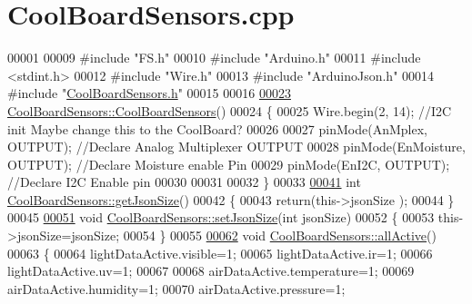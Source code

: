 \hypertarget{_cool_board_sensors_8cpp_source}{}\section{Cool\+Board\+Sensors.\+cpp}

\begin{DoxyCode}
00001 
00009 \textcolor{preprocessor}{#include "FS.h"}
00010 \textcolor{preprocessor}{#include "Arduino.h"}
00011 \textcolor{preprocessor}{#include <stdint.h>}        
00012 \textcolor{preprocessor}{#include "Wire.h"}
00013 \textcolor{preprocessor}{#include "ArduinoJson.h"}
00014 \textcolor{preprocessor}{#include "\hyperlink{_cool_board_sensors_8h}{CoolBoardSensors.h}"}
00015 
00016 
\hyperlink{class_cool_board_sensors_a91ff2a02f5486f90cf2413a1cf8a9ed4}{00023} \hyperlink{class_cool_board_sensors_a91ff2a02f5486f90cf2413a1cf8a9ed4}{CoolBoardSensors::CoolBoardSensors}()
00024 \{
00025     Wire.begin(2, 14);                       \textcolor{comment}{//I2C init Maybe change this to the CoolBoard?}
00026 
00027     pinMode(AnMplex, OUTPUT);                \textcolor{comment}{//Declare Analog Multiplexer OUTPUT}
00028     pinMode(EnMoisture, OUTPUT);             \textcolor{comment}{//Declare Moisture enable Pin}
00029     pinMode(EnI2C, OUTPUT);        \textcolor{comment}{//Declare I2C Enable pin }
00030 
00031 
00032 \}
00033 
\hyperlink{class_cool_board_sensors_ab82c2a1633768ccd12a589320fa31a14}{00041} \textcolor{keywordtype}{int} \hyperlink{class_cool_board_sensors_ab82c2a1633768ccd12a589320fa31a14}{CoolBoardSensors::getJsonSize}()
00042 \{
00043     \textcolor{keywordflow}{return}(this->jsonSize );
00044 \}
00045 
\hyperlink{class_cool_board_sensors_ab76e6dbd6efbcc25ff460535badd8d45}{00051} \textcolor{keywordtype}{void} \hyperlink{class_cool_board_sensors_ab76e6dbd6efbcc25ff460535badd8d45}{CoolBoardSensors::setJsonSize}(\textcolor{keywordtype}{int} jsonSize)
00052 \{
00053     this->jsonSize=jsonSize;
00054 \}
00055 
\hyperlink{class_cool_board_sensors_aa432c5aac88f89c31a10766390f23e0b}{00062} \textcolor{keywordtype}{void} \hyperlink{class_cool_board_sensors_aa432c5aac88f89c31a10766390f23e0b}{CoolBoardSensors::allActive}()
00063 \{
00064     lightDataActive.visible=1;
00065     lightDataActive.ir=1;
00066     lightDataActive.uv=1;   
00067 
00068     airDataActive.temperature=1;
00069     airDataActive.humidity=1;
00070     airDataActive.pressure=1;

\end{DoxyCode}
